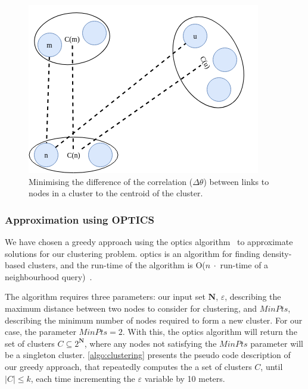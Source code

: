 
\begin{figure}[ht]
    \centering
    \includegraphics[width=.5\textwidth]{figures/clustering/clustering.png}
    \caption{Minimising the difference of the correlation ($\Delta\theta$) between links to nodes in a cluster to the centroid of the cluster.}
    \label{figure:clusteringgoal}
\end{figure}

\subsubsection{Approximation using OPTICS}
We have chosen a greedy approach using the \gls{optics} algorithm~\cite{Ankerst:1999:OOP:304182.304187} to approximate solutions for our clustering problem. \gls{optics} is an algorithm for finding density-based clusters, and the run-time of the algorithm is O($n \ \cdot $ run-time of a neighbourhood query)~\cite[p.~53]{Ankerst:1999:OOP:304182.304187}. \smallbreak

The algorithm requires three parameters: our input set $\textbf{N}$, $\varepsilon$, describing the maximum distance between two nodes to consider for clustering, and $MinPts$, describing the minimum number of nodes required to form a new cluster. For our case, the parameter $MinPts = 2$. With this, the \gls{optics} algorithm will return the set of clusters $C \subseteq 2^{\textbf{N}}$, where any nodes not satisfying the $MinPts$ parameter will be a singleton cluster. \autoref{algo:clustering} presents the pseudo code description of our greedy approach, that repeatedly computes the a set of clusters $C$, until $|C| \leq k$, each time incrementing the $\varepsilon$ variable by 10 meters.

